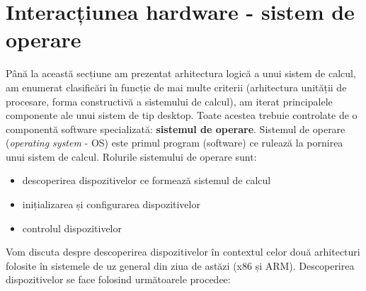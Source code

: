 \section{Interacțiunea hardware - sistem de operare}
\label{sec:hw:os-interact}

Până la această secțiune am prezentat arhitectura logică a unui sistem de calcul, am enumerat clasificări în funcție de mai multe criterii (arhitectura unității de procesare, forma constructivă a sistemului de calcul), am iterat principalele componente ale unui sistem de tip desktop.
Toate acestea trebuie controlate de o componentă software specializată: \textbf{sistemul de operare}.
 Sistemul de operare (\textit{operating system} - OS) este primul program (software) ce rulează la pornirea unui sistem de calcul.
Rolurile sistemului de operare sunt:

\begin{itemize}
  \item descoperirea dispozitivelor ce formează sistemul de calcul
  \item inițializarea și configurarea dispozitivelor
  \item controlul dispozitivelor
\end{itemize}

Vom discuta despre descoperirea dispozitivelor în contextul celor două arhitecturi folosite în sistemele de uz general din ziua de astăzi (x86 și ARM).
 Descoperirea dispozitivelor se face folosind următoarele procedee:

